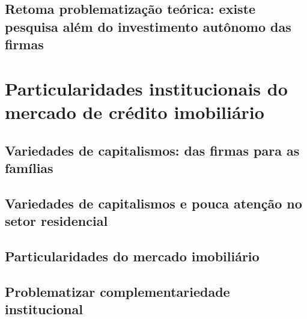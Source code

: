 \documentclass[11pt]{article}
\begin{document}
\subsection{Retoma problematização teórica: existe pesquisa além do investimento autônomo das firmas}
\label{sec:orga03bfd6}

\section{Particularidades institucionais do mercado de crédito imobiliário}
\label{sec:orgfb78cbf}

\subsection{Variedades de capitalismos: das firmas para as famílias}
\label{sec:org45ece34}




\subsection{Variedades de capitalismos e pouca atenção no setor residencial}
\label{sec:org30213e7}





\subsection{Particularidades do mercado imobiliário}
\label{sec:orgc93ff1d}






\subsection{Problematizar complementariedade institucional}
\label{sec:orgc83729a}
\end{document}
